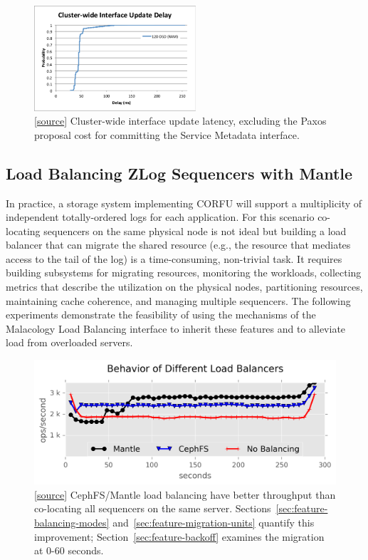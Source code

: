 \begin{figure}[tbp]
\centering
\includegraphics[width=60mm,trim={1 4 4 1.3cm},clip]{figures/iface-update-delay.pdf}
\caption{
[\href{https://github.com/michaelsevilla/malacology-popper/tree/v2.1/experiments/mon-paxos-update/viz.py}{source}]
Cluster-wide interface update latency, excluding the Paxos proposal cost for
committing the Service Metadata interface.}
\label{fig:propdelay}
\end{figure}

\subsection{Load Balancing ZLog Sequencers with Mantle}
\label{sec:zlog-balancing}

In practice, a storage system implementing CORFU will support a multiplicity of
independent totally-ordered logs for each application.  For this scenario
co-locating sequencers on the same physical node is not ideal but building a
load balancer that can migrate the shared resource (e.g., the resource
that mediates access to the tail of the log) is a time-consuming, non-trivial
task.  It requires building subsystems for migrating resources, monitoring the
workloads, collecting metrics that describe the utilization on the physical
nodes, partitioning resources, maintaining cache coherence, and managing
multiple sequencers. The following experiments demonstrate the feasibility of
using the mechanisms of the Malacology Load Balancing interface to inherit
these features and to alleviate load from overloaded servers.

\begin{figure}[t!]
\centering
\includegraphics{figures/mantle-balancer-behaviors.png}
\caption{
[\href{https://github.com/michaelsevilla/malacology-popper/blob/v2.1/experiments/mds-zlog-seq-migrate-redux-3client/results-mantle-runs/visualize.ipynb}{source}]
CephFS/Mantle load balancing have better throughput than co-locating all
sequencers on the same server.  Sections~\ref{sec:feature-balancing-modes}
and~\ref{sec:feature-migration-units} quantify this improvement;
Section~\ref{sec:feature-backoff} examines the migration at 0-60 seconds.
}\label{fig:mantle-balancer-behaviors}
\end{figure}

